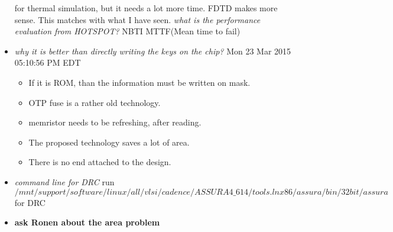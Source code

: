 \documentclass[]{article}
\newcommand{\todo}[1]{{\color{red}\textbf{#1}}}
\newcommand{\solved}[1]{{\color{blue}\textit{#1}}}
\begin{document}
\begin{itemize}
                for thermal simulation, but it needs a lot more time. FDTD makes
                more sense. This matches with what I have seen. \solved{what is
                the performance evaluation from HOTSPOT?} NBTI MTTF(Mean time to
                fail)
                \item \solved{why it is better than directly writing the keys on
                the chip?} Mon 23 Mar 2015 05:10:56 PM EDT 
                    \begin{itemize}
                        \item If it is ROM, than the information must be written on
                        mask.
                        \item OTP fuse is a rather old technology.
                        \item memristor needs to be refreshing, after reading.
                        \item The proposed technology saves a lot of area.
                        \item There is no end attached to the design.
                    \end{itemize}
                \item \solved{command line for DRC} run
                \begin{equation}
                /mnt/support/software/linux/all/vlsi/cadence/ASSURA4\_614/tools.lnx86/assura/bin/32bit/assura
                \end{equation}
                for DRC
                \item \todo{ask Ronen about the area problem}

                
        \end{itemize}
\end{document}
